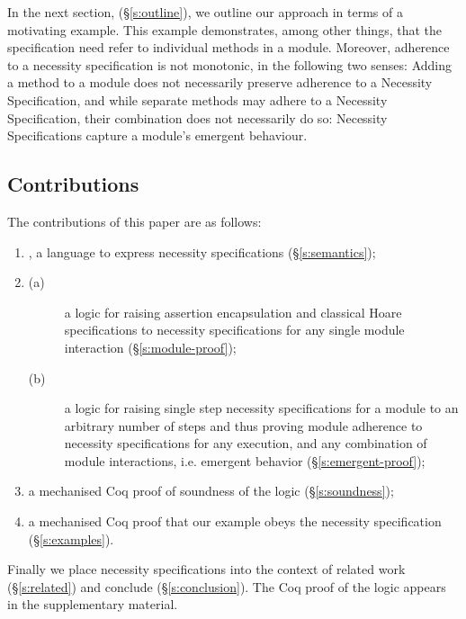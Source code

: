 In the next section, (\S\ref{s:outline}),  we outline our approach in terms of a motivating example.
This example demonstrates, among other things, that the specification need  refer  to  individual methods in a module.
Moreover, adherence to a necessity specification is not monotonic, in the following two senses:
Adding a method to a module does not necessarily preserve adherence to a Necessity Specification,
and while separate methods may adhere to a  Necessity Specification, their combination does
not necessarily do so: Necessity Specifications capture a module's emergent behaviour.


\subsection{Contributions}

The contributions of this paper are as follows:
 
 \begin{enumerate}
 \item
\Chainmail, a language to
express necessity specifications (\S\ref{s:semantics});
 \item
\begin{description}
\item [(a)]
{a logic for raising assertion encapsulation and classical Hoare specifications
to necessity specifications for any single module interaction (\S\ref{s:module-proof});}
\item [(b)]
 {a logic for raising single step necessity specifications for a module to an arbitrary number of steps
and thus proving module adherence to necessity specifications for any execution, and any combination of module interactions, i.e. emergent behavior (\S\ref{s:emergent-proof});}
\end{description}
\item
  a mechanised {Coq} proof of soundness of the logic (\S\ref{s:soundness});
\item
  a  {mechanised Coq} proof that %
  our example obeys the necessity
  specification (\S\ref{s:examples}).
\end{enumerate}


\noindent Finally we place necessity specifications into the context
of related work (\S\ref{s:related}) and conclude (\S\ref{s:conclusion}).
The Coq proof of the logic appears in the
supplementary material.








